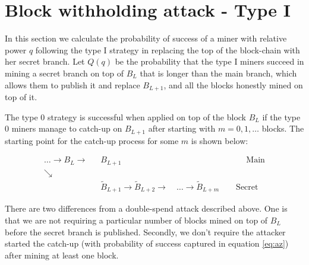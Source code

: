 \documentclass[letterpaper,12pt]{report}
\theoremstyle{plain}
\theoremstyle{definition}
\begin{document}
\section{Block withholding attack - Type I}

In this section we calculate the probability of success of a miner with relative power $q$ following the type I strategy in replacing the top of the block-chain with her secret branch.
Let $\mathit{Q}(q)$  be the probability that the type I miners succeed in mining a secret branch on top of $\mathit{B}_L$ that is longer than the main branch, which allows them to publish it and replace $\mathit{B}_{L+1}$, and all the blocks honestly mined on top of it. 

The type 0 strategy is successful when applied on top of the block $\mathit{B}_L$ if the type 0 miners manage to catch-up on $B_{L+1}$ after starting with $m=0,1,\dots$ blocks. The starting point for the catch-up process for some $m$ is shown below:

\begin{eqnarray}\label{blockwithholdingboundary}
 \dots \rightarrow \mathit{B}_L\rightarrow &\mathit{B}_{L+1} \qquad\qquad\qquad\qquad\qquad\qquad\qquad\quad \mathrm{Main}\\\nonumber
\searrow & \\\nonumber
\qquad \qquad \qquad & \widetilde{\mathit{B}}_{L+1}\rightarrow\widetilde{\mathit{B}}_{L+2}
\longrightarrow \quad \dots \longrightarrow\widetilde{\mathit{B}}_{L+m}\qquad \mathrm{Secret}
\end{eqnarray}

There are two differences from a double-spend attack described above. One is that we are not requiring a particular number of blocks mined on top of $\mathit{B}_L$ before the secret branch is published. Secondly, we don't require the attacker started the catch-up (with probability of success captured in equation \ref{eq:az}) after mining at least one block. 
\end{document}
